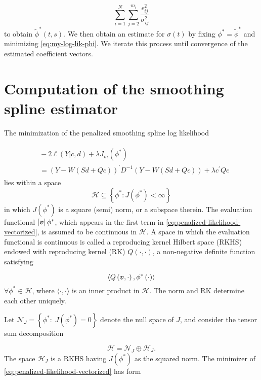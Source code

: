 \documentclass[12pt]{article}
\newcommand{\Hilbert}{\mathcal{H}}
\newcommand{\bfv}{\mbox{\boldmath $v$}}
\theoremstyle{definition}
\begin{document}
\begin{equation} \label{eq:loglik-phi-component}
 \sum_{i = 1}^N \sum_{j = 2}^{m_i} \frac{\epsilon_{ij}^2}{\sigma_{ij}^{2}}
\end{equation}
\noindent
to obtain $\tilde{\phi}^*\left(t,s\right)$. We then obtain an estimate for $\sigma\left(t\right)$ by fixing $\phi^* = \tilde{\phi}^*$ and minimizing \ref{eq:my-log-lik-phi}.  We iterate this process until convergence of the estimated coefficient vectors. 

\bigskip


\section{Computation of the smoothing spline estimator}

The minimization of the penalized smoothing spline log likelihood 

\begin{align}
\begin{split} \label{eq:penalized-likelihood-vectorized} 
 &\mbox{} -2\ell\left(Y \vert c,d\right) + \lambda J_m\left(\phi^*\right)\\
&= \left( Y - W \left( Sd + Qc \right) \right)^\prime D^{-1} \left( Y - W \left( Sd + Qc \right) \right) + \lambda c^\prime Q c 
\end{split}
\end{align} 
\bigskip
\noindent
lies within a space 
\[
\Hilbert \subseteq \left \{ \phi^*: J\left(\phi^*\right) < \infty \right\}
\]
\noindent
in which $J\left(\phi^*\right)$ is a square (semi) norm, or a subspace therein. The evaluation functional $\left[ \bfv \right] \phi^*$, which appears in the first term in \ref{eq:penalized-likelihood-vectorized}, is assumed to be continuous in $\Hilbert$. A space in which the evaluation functional is continuous is called a reproducing kernel Hilbert space (RKHS) endowed with reproducing kernel (RK) $Q\left(\cdot, \cdot\right)$, a non-negative definite function satisfying 

\[
\langle Q\left(\bfv,\cdot\right), \phi^*\left(\cdot\right) \rangle
\]
\bigskip
\noindent
$\forall \phi^* \in \Hilbert$, where $\langle \cdot, \cdot \rangle$ is an inner product in $\Hilbert$. The norm and RK determine each other uniquely.

Let $\mathcal{N}_J = \left\{ \phi^*:\; J\left(\phi^*\right) = 0\right\}$ denote the null space of $J$, and consider the tensor sum decomposition

\[
\Hilbert = \mathcal{N}_J \oplus \Hilbert_J.
\]
\noindent
The space $\Hilbert_J$ is a RKHS having $J\left(\phi^*\right)$ as the squared norm. The minimizer of \ref{eq:penalized-likelihood-vectorized} has form 
\end{document}
